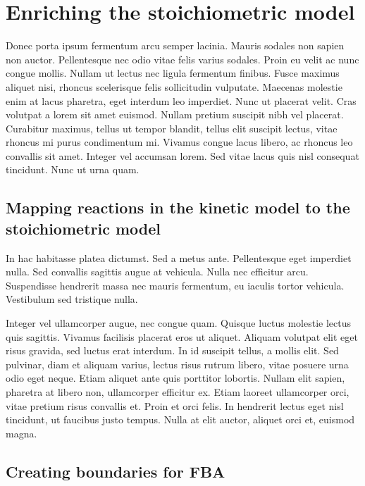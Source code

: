 \documentclass[parskip=full]{scrreprt}
\begin{document}
\chapter{Enriching the stoichiometric model}
\label{ch:stoich}

Donec porta ipsum fermentum arcu semper lacinia. Mauris sodales non sapien non auctor. Pellentesque nec odio vitae felis varius sodales. Proin eu velit ac nunc congue mollis. Nullam ut lectus nec ligula fermentum finibus. Fusce maximus aliquet nisi, rhoncus scelerisque felis sollicitudin vulputate. Maecenas molestie enim at lacus pharetra, eget interdum leo imperdiet. Nunc ut placerat velit. Cras volutpat a lorem sit amet euismod. Nullam pretium suscipit nibh vel placerat. Curabitur maximus, tellus ut tempor blandit, tellus elit suscipit lectus, vitae rhoncus mi purus condimentum mi. Vivamus congue lacus libero, ac rhoncus leo convallis sit amet. Integer vel accumsan lorem. Sed vitae lacus quis nisl consequat tincidunt. Nunc ut urna quam. 

\section{Mapping reactions in the kinetic model to the stoichiometric model}
\label{sec:mapping}

In hac habitasse platea dictumst. Sed a metus ante. Pellentesque eget imperdiet nulla. Sed convallis sagittis augue at vehicula. Nulla nec efficitur arcu. Suspendisse hendrerit massa nec mauris fermentum, eu iaculis tortor vehicula. Vestibulum sed tristique nulla.

Integer vel ullamcorper augue, nec congue quam. Quisque luctus molestie lectus quis sagittis. Vivamus facilisis placerat eros ut aliquet. Aliquam volutpat elit eget risus gravida, sed luctus erat interdum. In id suscipit tellus, a mollis elit. Sed pulvinar, diam et aliquam varius, lectus risus rutrum libero, vitae posuere urna odio eget neque. Etiam aliquet ante quis porttitor lobortis. Nullam elit sapien, pharetra at libero non, ullamcorper efficitur ex. Etiam laoreet ullamcorper orci, vitae pretium risus convallis et. Proin et orci felis. In hendrerit lectus eget nisl tincidunt, ut faucibus justo tempus. Nulla at elit auctor, aliquet orci et, euismod magna.

\section{Creating boundaries for FBA}
\label{sec:bounds}
\end{document}
